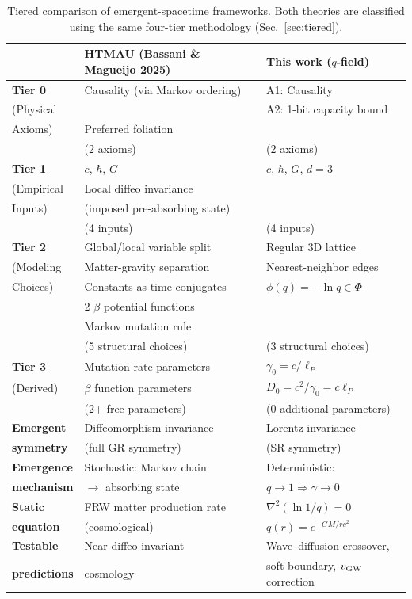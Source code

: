 \documentclass[aps,prd,twocolumn,showpacs,superscriptaddress,preprintnumbers]{revtex4-2}
\begin{document}
\begin{table}[h]
\centering
\caption{Tiered comparison of emergent-spacetime frameworks. Both theories are classified using the same four-tier methodology (Sec.~\ref{sec:tiered}).}
\label{tab:compare_htmau}
\begin{tabular}{p{}p{}p{}}
\toprule
& \textbf{HTMAU (Bassani \& Magueijo 2025)} & \textbf{This work ($q$-field)} \\
\midrule
\textbf{Tier 0} & Causality (via Markov ordering) & A1: Causality \\
(Physical & & A2: 1-bit capacity bound \\
Axioms) & Preferred foliation & \\
& (2 axioms) & (2 axioms) \\
\midrule
\textbf{Tier 1} & $c$, $\hbar$, $G$ & $c$, $\hbar$, $G$, $d=3$ \\
(Empirical & Local diffeo invariance & \\
Inputs) & (imposed pre-absorbing state) & \\
& (4 inputs) & (4 inputs) \\
\midrule
\textbf{Tier 2} & Global/local variable split & Regular 3D lattice \\
(Modeling & Matter-gravity separation & Nearest-neighbor edges \\
Choices) & Constants as time-conjugates & $\phi(q)=-\ln q\in\Phi$ \\
& 2 $\beta$ potential functions & \\
& Markov mutation rule & \\
& (5 structural choices) & (3 structural choices) \\
\midrule
\textbf{Tier 3} & Mutation rate parameters & $\gamma_0=c/\ell_P$ \\
(Derived) & $\beta$ function parameters & $D_0=c^2/\gamma_0=c\ell_P$ \\
& (2+ free parameters) & (0 additional parameters) \\
\midrule
\textbf{Emergent} & Diffeomorphism invariance & Lorentz invariance \\
\textbf{symmetry} & (full GR symmetry) & (SR symmetry) \\
\midrule
\textbf{Emergence} & Stochastic: Markov chain & Deterministic: \\
\textbf{mechanism} & $\to$ absorbing state & $q\to1 \Rightarrow \gamma\to0$ \\
\midrule
\textbf{Static} & FRW matter production rate & $\nabla^2(\ln 1/q)=0$ \\
\textbf{equation} & (cosmological) & $q(r)=e^{-GM/rc^2}$ \\
\midrule
\textbf{Testable} & Near-diffeo invariant & Wave--diffusion crossover, \\
\textbf{predictions} & cosmology & soft boundary, $v_{\rm GW}$ correction \\
\bottomrule
\end{tabular}
\end{table}
\end{document}

